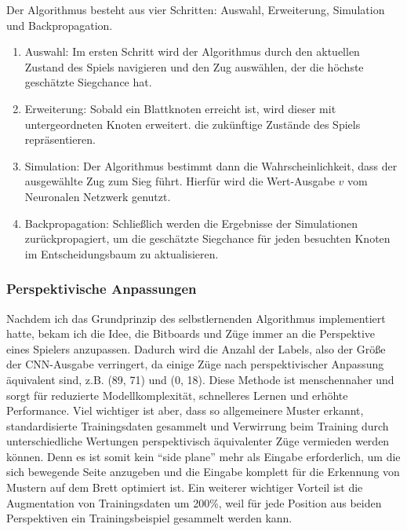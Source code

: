 \documentclass{jpp}
\begin{document}
Der Algorithmus besteht aus vier Schritten: Auswahl, Erweiterung, Simulation und Backpropagation.
\begin{enumerate}

\item Auswahl: Im ersten Schritt wird der Algorithmus durch den aktuellen Zustand des Spiels navigieren und den Zug auswählen, der die höchste geschätzte Siegchance hat.

\item Erweiterung: Sobald ein Blattknoten erreicht ist, wird dieser mit untergeordneten Knoten erweitert. die zukünftige Zustände des Spiels repräsentieren.

\item Simulation: Der Algorithmus bestimmt dann die Wahrscheinlichkeit, dass der ausgewählte Zug zum Sieg führt. Hierfür wird die Wert-Ausgabe $v$ vom Neuronalen Netzwerk genutzt.

\item Backpropagation: Schließlich werden die Ergebnisse der Simulationen zurückpropagiert, um die geschätzte Siegchance für jeden besuchten Knoten im Entscheidungsbaum zu aktualisieren.
\end{enumerate}

\subsubsection{Perspektivische Anpassungen}
Nachdem ich das Grundprinzip des selbstlernenden Algorithmus  implementiert hatte, bekam ich die Idee, die Bitboards und Züge immer an die Perspektive eines  Spielers anzupassen.
Dadurch wird die Anzahl der Labels, also der Größe der CNN-Ausgabe verringert, da einige Züge nach perspektivischer Anpassung äquivalent sind, z.B. (89, 71) und (0, 18). Diese Methode ist menschennaher und sorgt für reduzierte Modellkomplexität, schnelleres Lernen und erhöhte Performance. Viel wichtiger ist aber, dass so allgemeinere Muster erkannt, standardisierte Trainingsdaten gesammelt und Verwirrung beim Training durch unterschiedliche Wertungen perspektivisch äquivalenter Züge vermieden werden können. Denn es ist somit kein “side plane” mehr als Eingabe erforderlich, um die sich bewegende Seite anzugeben und die Eingabe komplett für die Erkennung von Mustern auf dem Brett optimiert ist. Ein weiterer wichtiger Vorteil ist die Augmentation von Trainingsdaten um 200\%, weil für jede Position aus beiden Perspektiven ein Trainingsbeispiel gesammelt werden kann.
\end{document}
